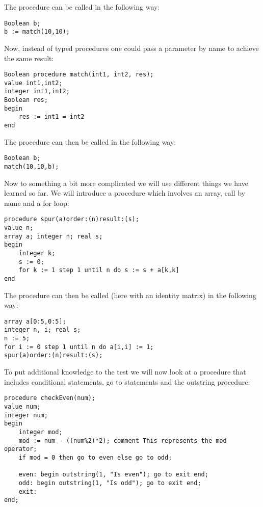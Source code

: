 \documentclass{article}
\begin{document}
The procedure can be called in the following way:

\begin{lstlisting}[language={[60]algol}]
Boolean b;
b := match(10,10);
\end{lstlisting}

Now, instead of typed procedures one could pass a parameter by name to achieve the same result:

\begin{lstlisting}[language={[60]algol}]
Boolean procedure match(int1, int2, res);
value int1,int2;
integer int1,int2;
Boolean res;
begin
    res := int1 = int2
end
\end{lstlisting}

The procedure can then be called in the following way:

\begin{lstlisting}[language={[60]algol}]
Boolean b;
match(10,10,b);
\end{lstlisting}

Now to something a bit more complicated we will use different things we have learned so far. We will introduce a procedure which involves an array, call by name and a for loop:

\begin{lstlisting}[language={[60]algol}]
procedure spur(a)order:(n)result:(s);
value n;
array a; integer n; real s;
begin
    integer k;
    s := 0;
    for k := 1 step 1 until n do s := s + a[k,k]
end
\end{lstlisting}

The procedure can then be called (here with an identity matrix) in the following way:

\begin{lstlisting}[language={[60]algol}]
array a[0:5,0:5];
integer n, i; real s;
n := 5;
for i := 0 step 1 until n do a[i,i] := 1;
spur(a)order:(n)result:(s);
\end{lstlisting}

To put additional knowledge to the test we will now look at a procedure that includes conditional statements, go to statements and the outstring procedure:

\begin{lstlisting}[language={[60]algol}]
procedure checkEven(num);
value num;
integer num;
begin
    integer mod;
    mod := num - ((num%2)*2); comment This represents the mod operator;
    if mod = 0 then go to even else go to odd;
    
    even: begin outstring(1, "Is even"); go to exit end;
    odd: begin outstring(1, "Is odd"); go to exit end;
    exit:
end;
\end{lstlisting}
\end{document}
